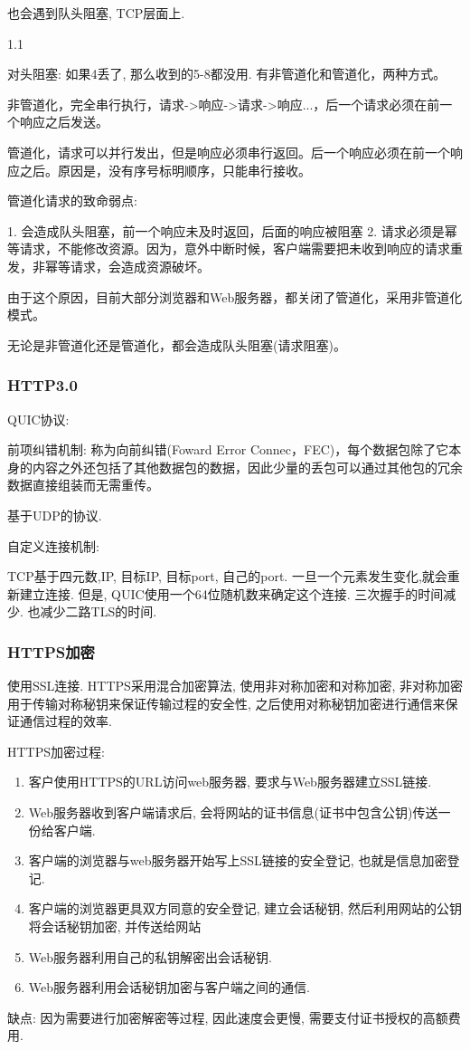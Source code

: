 \documentclass[UTF8]{ctexart}
\begin{document}
也会遇到队头阻塞, TCP层面上.

1.1

对头阻塞: 如果4丢了, 那么收到的5-8都没用.
有非管道化和管道化，两种方式。

非管道化，完全串行执行，请求->响应->请求->响应...，后一个请求必须在前一个响应之后发送。

管道化，请求可以并行发出，但是响应必须串行返回。后一个响应必须在前一个响应之后。原因是，没有序号标明顺序，只能串行接收。

管道化请求的致命弱点:

1. 会造成队头阻塞，前一个响应未及时返回，后面的响应被阻塞
2. 请求必须是幂等请求，不能修改资源。因为，意外中断时候，客户端需要把未收到响应的请求重发，非幂等请求，会造成资源破坏。

由于这个原因，目前大部分浏览器和Web服务器，都关闭了管道化，采用非管道化模式。

无论是非管道化还是管道化，都会造成队头阻塞(请求阻塞)。

\subsubsection{HTTP3.0}

QUIC协议:

前项纠错机制: 称为向前纠错(Foward Error Connec，FEC)，每个数据包除了它本身的内容之外还包括了其他数据包的数据，因此少量的丢包可以通过其他包的冗余数据直接组装而无需重传。

基于UDP的协议.

自定义连接机制:

TCP基于四元数,IP, 目标IP, 目标port, 自己的port. 一旦一个元素发生变化,就会重新建立连接.
但是, QUIC使用一个64位随机数来确定这个连接. 三次握手的时间减少. 也减少二路TLS的时间.




\subsubsection{HTTPS加密}
使用SSL连接. HTTPS采用混合加密算法, 使用非对称加密和对称加密, 非对称加密用于传输对称秘钥来保证传输过程的安全性, 之后使用对称秘钥加密进行通信来保证通信过程的效率.
\par
HTTPS加密过程:
\begin{enumerate}
	\item 客户使用HTTPS的URL访问web服务器, 要求与Web服务器建立SSL链接.
	\item Web服务器收到客户端请求后, 会将网站的证书信息(证书中包含公钥)传送一份给客户端.
	\item 客户端的浏览器与web服务器开始写上SSL链接的安全登记, 也就是信息加密登记.
	\item 客户端的浏览器更具双方同意的安全登记, 建立会话秘钥, 然后利用网站的公钥将会话秘钥加密, 并传送给网站
	\item Web服务器利用自己的私钥解密出会话秘钥.
	\item Web服务器利用会话秘钥加密与客户端之间的通信.
\end{enumerate}
\par
缺点: 因为需要进行加密解密等过程, 因此速度会更慢, 需要支付证书授权的高额费用.
\end{document}
